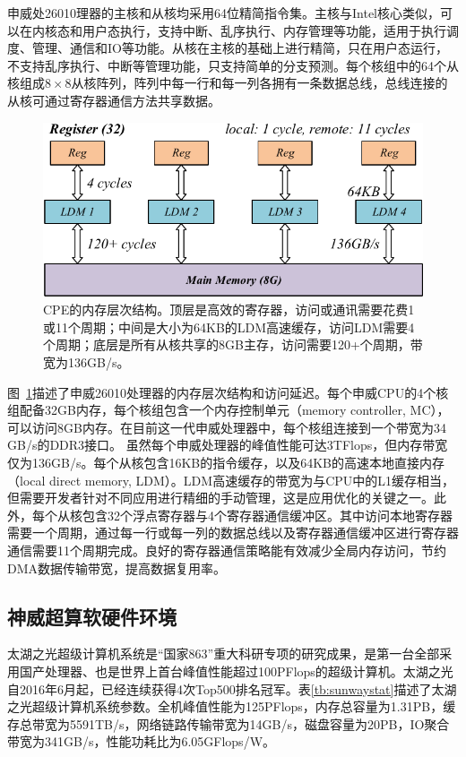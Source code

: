 \documentclass[degree=doctor]{thuthesis}
\begin{document}
申威处26010理器的主核和从核均采用64位精简指令集。主核与Intel核心类似，可以在内核态和用户态执行，支持中断、乱序执行、内存管理等功能，适用于执行调度、管理、通信和IO等功能。从核在主核的基础上进行精简，只在用户态运行，不支持乱序执行、中断等管理功能，只支持简单的分支预测。每个核组中的64个从核组成$8\times8$从核阵列，阵列中每一行和每一列各拥有一条数据总线，总线连接的从核可通过寄存器通信方法共享数据。

\begin{figure}[ht]
\centering
\includegraphics[width=.8\columnwidth]{memory_hierarchy.pdf}
\caption{CPE的内存层次结构。顶层是高效的寄存器，访问或通讯需要花费1或11个周期；中间是大小为64KB的LDM高速缓存，访问LDM需要4个周期；底层是所有从核共享的8GB主存，访问需要120+个周期，带宽为136GB/s。}
\label{fig:sunway_mem}
\end{figure}

图~\ref {fig:sunway_mem}描述了申威26010处理器的内存层次结构和访问延迟。每个申威CPU的4个核组配备32GB内存，每个核组包含一个内存控制单元（memory controller, MC），可以访问8GB内存。在目前这一代申威处理器中，每个核组连接到一个带宽为34 GB/s的DDR3接口。 虽然每个申威处理器的峰值性能可达3TFlops，但内存带宽仅为136GB/s。每个从核包含16KB的指令缓存，以及64KB的高速本地直接内存（local direct memory, LDM）。LDM高速缓存的带宽为与CPU中的L1缓存相当，但需要开发者针对不同应用进行精细的手动管理，这是应用优化的关键之一。此外，每个从核包含32个浮点寄存器与4个寄存器通信缓冲区。其中访问本地寄存器需要一个周期，通过每一行或每一列的数据总线以及寄存器通信缓冲区进行寄存器通信需要11个周期完成。良好的寄存器通信策略能有效减少全局内存访问，节约DMA数据传输带宽，提高数据复用率。

\subsection{神威超算软硬件环境}
\label{sub:神威超算软硬件环境}
太湖之光超级计算机系统是“国家863”重大科研专项的研究成果，是第一台全部采用国产处理器、也是世界上首台峰值性能超过100PFlops的超级计算机。太湖之光自2016年6月起，已经连续获得4次Top500排名冠军。表\ref{tb:sunwaystat}描述了太湖之光超级计算机系统参数。全机峰值性能为125PFlops，内存总容量为1.31PB，缓存总带宽为5591TB/s，网络链路传输带宽为14GB/s，磁盘容量为20PB，IO聚合带宽为341GB/s，性能功耗比为6.05GFlops/W。
\end{document}
